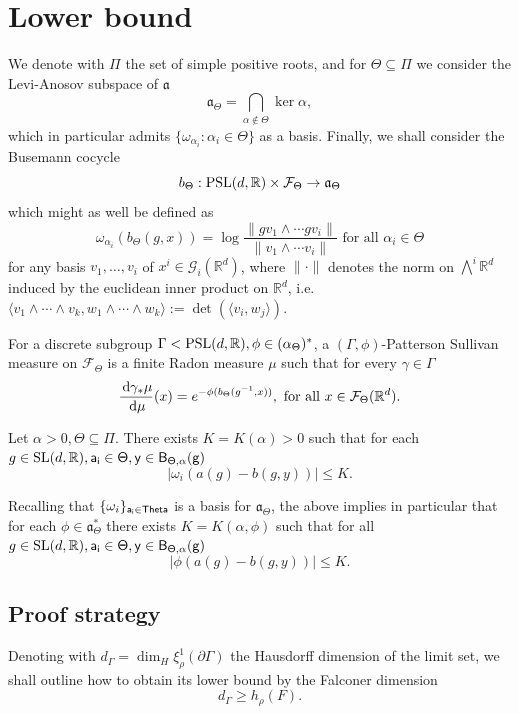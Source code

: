 \documentclass{report}
\begin{document}
\chapter{Lower bound}
We denote with $\Pi$ the set of simple positive roots, and for $\Theta \subseteq \Pi$ we consider the Levi-Anosov subspace of $\mathfrak a$
\[
    \mathfrak a_\Theta = \bigcap_{\alpha \notin \Theta} \ker \alpha,
\]
which in particular admits $\{ \omega_{\alpha_i} : \alpha_i \in \Theta \}$ as a basis.
Finally, we shall consider the Busemann cocycle
\[
    b_\Theta : \operatorname{{\mathrm{PSL}}}(d, \mathbb R) \times \mathcal F_\Theta \to \mathfrak a_\Theta
\]
which might as well be defined as
\[
    \omega_{\alpha_i}(b_\Theta(g, x)) =
    \log \frac{\| g v_1 \wedge \cdots g v_i \|}{ \| v_1 \wedge \cdots v_i \| }
    \text{ for all } \alpha_i \in \Theta
\]
for any basis $v_1, \ldots, v_i$ of $x^i \in \mathcal G_i(\mathbb R^d)$, where $\| \cdot \|$ denotes the norm on $\bigwedge^i \mathbb R^d$ induced by the euclidean inner product on $\mathbb R^d$, 
i.e.\ $ \langle v_1 \wedge \cdots \wedge v_k, w_1 \wedge \cdots \wedge w_k \rangle := \det(\langle v_i, w_j \rangle)$.
\begin{definition}
    For a discrete subgroup $\Gamma < \operatorname{{\mathrm{PSL}}}(d, \mathbb R), \phi \in (\alpha_\Theta)^*$,
    a $(\Gamma, \phi)$-Patterson Sullivan measure on $\mathcal F_\Theta$ is a finite Radon measure $\mu$ such that for every $\gamma \in \Gamma$
    \[
        \frac{\,\mathrm{d}\gamma_* \mu}{\,\mathrm{d}\mu}(x) = e^{-\phi(b_\Theta(g^{-1},x))}, \text{ for all } x \in \mathcal F_\Theta(\mathbb R^d).
    \]
\end{definition}

\begin{lemma}
Let $\alpha > 0, \Theta \subseteq \Pi$.
There exists $K = K(\alpha) > 0$ such that for each $g \in \operatorname{{\mathrm{SL}}}(d, \mathbb R), \sf{a_i} \in \Theta, y \in B_{\Theta, \alpha}(g)$
\[
    |\omega_i (a(g) - b(g, y))| \leq K.
\]
\end{lemma}
Recalling that $\{ \omega_i \}_{\sf a_i \in Theta} $ is a basis for $\mathfrak a_\Theta$, the above implies in particular that for each $\phi \in \mathfrak a_\Theta^*$ there exists $K = K(\alpha, \phi)$ such that for all $g \in \operatorname{{\mathrm{SL}}}(d, \mathbb R), \sf{a_i} \in \Theta, y \in B_{\Theta, \alpha}(g)$
\[
    |\phi (a(g) - b(g, y))| \leq K.
\]
\section{Proof strategy}
Denoting with $d_\Gamma = \dim_H \xi_\rho^1(\partial \Gamma)$ the Hausdorff  dimension of the limit set, we shall outline how to obtain its lower bound by the Falconer dimension
\[
    d_\Gamma \geq h_\rho(F).
\]
\end{document}
